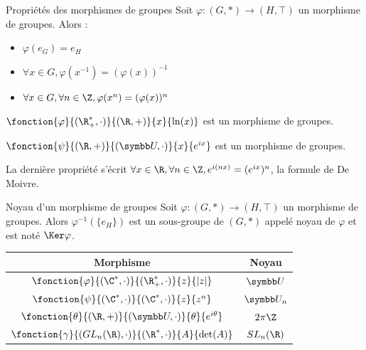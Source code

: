 \begin{proposition}{Propriétés des morphismes de groupes}{}
    Soit $\varphi : (G, \ast) \to (H, \top)$ un morphisme de groupes.
    Alors :
    \begin{itemize}
        \item $\varphi(e_G) = e_H$
        \item $\forall x \in G, \varphi(x^{-1}) = (\varphi(x))^{-1}$
        \item $\forall x \in G, \forall n \in \Z, \varphi(x^n) = (\varphi(x))^n$
    \end{itemize}
\end{proposition}

\begin{exemple}
    $\fonction{\varphi}{(\R_+^*, \cdot)}{(\R, +)}{x}{\ln(x)}$ est un morphisme de groupes.
    
    $\fonction{\psi}{(\R, +)}{(\symbb U, \cdot)}{x}{e^{ix}}$ est un morphisme de groupes.

    La dernière propriété s'écrit $\forall x \in \R, \forall n \in \Z, e^{i(nx)} = (e^{ix})^n$, 
    la formule de De Moivre.
\end{exemple}

\begin{theoreme}{Noyau d'un morphisme de groupes}{}
    Soit $\varphi : (G, \ast) \to (H, \top)$ un morphisme de groupes. 
    Alors $\varphi^{-1}(\{e_H\})$ est un sous-groupe de $(G, \ast)$ appelé noyau de 
    $\varphi$ et est noté $\Ker \varphi$.
\end{theoreme}

\begin{exemple}
    \begin{center}
    \begin{tabular}{cc}
        \toprule
        Morphisme & Noyau \\
        \midrule
        $\fonction{\varphi}{(\C^*, \cdot)}{(\R_+^*, \cdot)}{z}{|z|}$ & $\symbb U$ \\
        \addlinespace[2pt]
        $\fonction{\psi}{(\C^*, \cdot)}{(\C^*, \cdot)}{z}{z^n}$ & $\symbb U_n$ \\
        \addlinespace[2pt]
        $\fonction{\theta}{(\R, +)}{(\symbb U, \cdot)}{\theta}{e^{i\theta}}$ & $2\pi \Z$ \\
        \addlinespace[2pt]
        $\fonction{\gamma}{(GL_n(\R), \cdot)}{(\R^*, \cdot)}{A}{\det(A)}$ & $SL_n(\R)$ \\
        \bottomrule        
    \end{tabular}
    \end{center}
\end{exemple}

